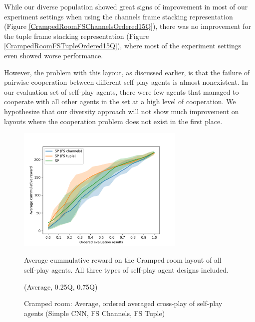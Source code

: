 While our diverse population showed great signs of improvement in most of our experiment settings when using the channels frame stacking representation (Figure \ref{CrampedRoomFSChannelsOrdered15Q}), there was no improvement for the tuple frame stacking representation (Figure \ref{CrampedRoomFSTupleOrdered15Q}), where most of the experiment settings even showed worse performance.

However, the problem with this layout, as discussed earlier, is that the failure of pairwise cooperation between different self-play agents is almost nonexistent.
In our evaluation set of self-play agents, there were few agents that managed to cooperate with all other agents in the set at a high level of cooperation.
We hypothesize that our diversity approach will not show much improvement on layouts where the cooperation problem does not exist in the first place.



\begin{figure}[!ht]
    \centering
    \includegraphics*[width=8cm]{../img/CrampedRoomFSVariantsOrderedAvg.png}

    \caption{Cramped room: Average, ordered averaged cross-play of self-play agents (Simple CNN, FS Channels, FS Tuple)}
    \label{CrampedRoomFSVariantsOrderedAvg}
    \medskip
    \small 
    Average cummulative reward on the Cramped room layout of all self-play agents.
    All three types of self-play agent designs included.

    (Average, 0.25Q, 0.75Q)

\end{figure}



